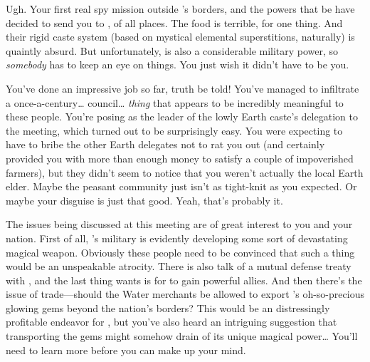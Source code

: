 \documentclass[char]{iron}
\begin{document}
\name{\cSpy{}}



Ugh. Your first real spy mission outside \sSpyCountry{}'s borders, and the powers that be have decided to send you to \emph{\sHomeCountry{}}, of all places. The food is terrible, for one thing. And their rigid caste system (based on mystical elemental superstitions, naturally) is quaintly absurd. But unfortunately, \sHomeCountry{} is also a considerable military power, so \emph{somebody} has to keep an eye on things. You just wish it didn't have to be you.

You've done an impressive job so far, truth be told! You've managed to infiltrate a once-a-century\ldots{} council\ldots{} \emph{thing} that appears to be incredibly meaningful to these people. You're posing as the leader of the lowly Earth caste's delegation to the meeting, which turned out to be surprisingly easy. You were expecting to have to bribe the other Earth delegates not to rat you out (and \sSpyCountry{} certainly provided you with more than enough money to satisfy a couple of impoverished farmers), but they didn't seem to notice that you weren't actually the local Earth elder. Maybe the peasant community just isn't as tight-knit as you expected. Or maybe your disguise is just that good. Yeah, that's probably it.

The issues being discussed at this meeting are of great interest to you and your nation. First of all, \sHomeCountry{}'s military is evidently developing some sort of devastating magical weapon. Obviously these people need to be convinced that such a thing would be an unspeakable atrocity. There is also talk of a mutual defense treaty with \sTreatyCountry{}, and the last thing \sSpyCountry{} wants is for \sHomeCountry{} to gain powerful allies. And then there's the issue of trade---should the Water merchants be allowed to export \sHomeCountry{}'s oh-so-precious glowing gems beyond the nation's borders? This would be an distressingly profitable endeavor for \sHomeCountry{}, but you've also heard an intriguing suggestion that transporting the gems might somehow drain \sHomeCountry{} of its unique magical power\ldots{} You'll need to learn more before you can make up your mind.
\end{document}
